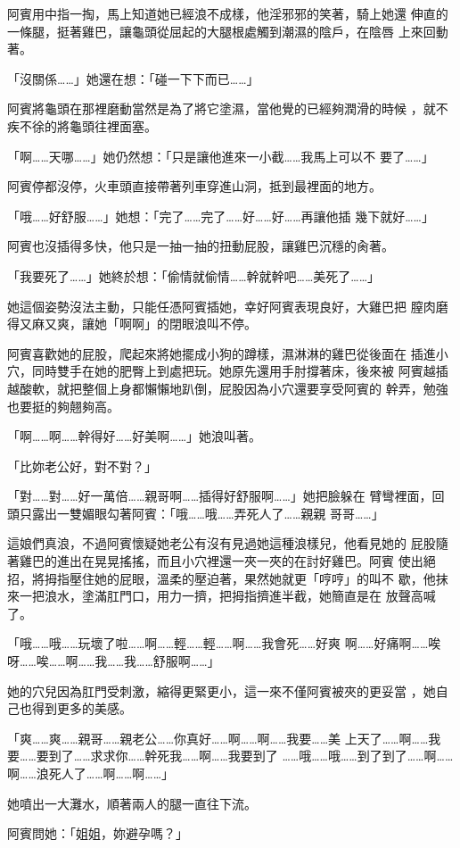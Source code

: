 阿賓用中指一掏，馬上知道她已經浪不成樣，他淫邪邪的笑著，騎上她還
伸直的一條腿，挺著雞巴，讓龜頭從屈起的大腿根處觸到潮濕的陰戶，在陰唇
上來回動著。

「沒關係……」她還在想：「碰一下下而已……」

阿賓將龜頭在那裡磨動當然是為了將它塗濕，當他覺的已經夠潤滑的時候
，就不疾不徐的將龜頭往裡面塞。

「啊……天哪……」她仍然想：「只是讓他進來一小截……我馬上可以不
要了……」

阿賓停都沒停，火車頭直接帶著列車穿進山洞，抵到最裡面的地方。

「哦……好舒服……」她想：「完了……完了……好……好……再讓他插
幾下就好……」

阿賓也沒插得多快，他只是一抽一抽的扭動屁股，讓雞巴沉穩的肏著。

「我要死了……」她終於想：「偷情就偷情……幹就幹吧……美死了……」

她這個姿勢沒法主動，只能任憑阿賓插她，幸好阿賓表現良好，大雞巴把
膣肉磨得又麻又爽，讓她「啊啊」的閉眼浪叫不停。

阿賓喜歡她的屁股，爬起來將她擺成小狗的蹲樣，濕淋淋的雞巴從後面在
插進小穴，同時雙手在她的肥臀上到處把玩。她原先還用手肘撐著床，後來被
阿賓越插越酸軟，就把整個上身都懶懶地趴倒，屁股因為小穴還要享受阿賓的
幹弄，勉強也要挺的夠翹夠高。

「啊……啊……幹得好……好美啊……」她浪叫著。

「比妳老公好，對不對？」

「對……對……好一萬倍……親哥啊……插得好舒服啊……」她把臉躲在
臂彎裡面，回頭只露出一雙媚眼勾著阿賓：「哦……哦……弄死人了……親親
哥哥……」

這娘們真浪，不過阿賓懷疑她老公有沒有見過她這種浪樣兒，他看見她的
屁股隨著雞巴的進出在晃晃搖搖，而且小穴裡還一夾一夾的在討好雞巴。阿賓
使出絕招，將拇指壓住她的屁眼，溫柔的壓迫著，果然她就更「哼哼」的叫不
歇，他抹來一把浪水，塗滿肛門口，用力一擠，把拇指擠進半截，她簡直是在
放聲高喊了。

「哦……哦……玩壞了啦……啊……輕……輕……啊……我會死……好爽
啊……好痛啊……唉呀……唉……啊……我……我……舒服啊……」

她的穴兒因為肛門受刺激，縮得更緊更小，這一來不僅阿賓被夾的更妥當
，她自己也得到更多的美感。

「爽……爽……親哥……親老公……你真好……啊……啊……我要……美
上天了……啊……我要……要到了……求求你……幹死我……啊……我要到了
……哦……哦……到了到了……啊……啊……浪死人了……啊……啊……」

她噴出一大灘水，順著兩人的腿一直往下流。

阿賓問她：「姐姐，妳避孕嗎？」

